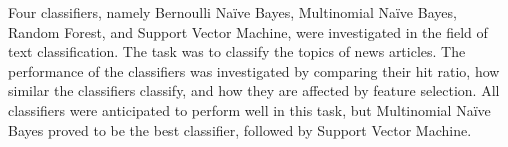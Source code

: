 \noindent Four classifiers, namely Bernoulli Naïve Bayes, Multinomial Naïve Bayes, Random Forest, and Support Vector Machine, were investigated in the field of text classification. The task was to classify the topics of news articles. The performance of the classifiers was investigated by comparing their hit ratio, how similar the classifiers classify, and how they are affected by feature selection. All classifiers were anticipated to perform well in this task, but Multinomial Naïve Bayes proved to be the best classifier, followed by Support Vector Machine.